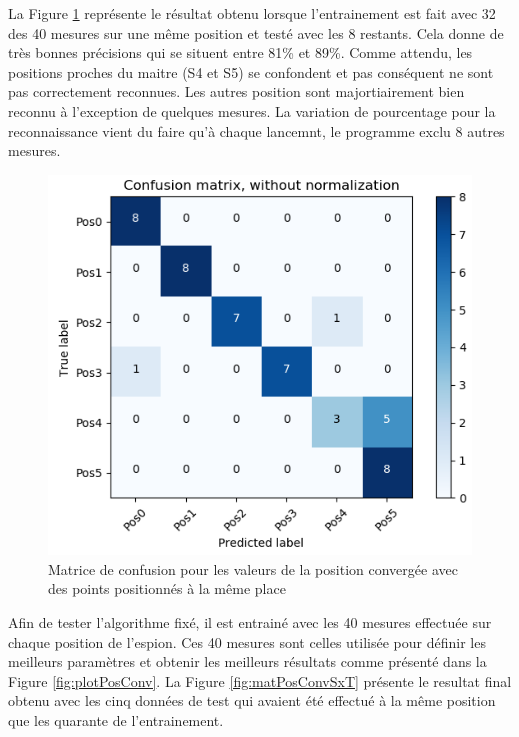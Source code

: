 La Figure \ref{fig:matPosConvSx} représente le résultat obtenu lorsque l'entrainement est fait avec 32 des 40 mesures sur une même position et testé avec les 8 restants. Cela donne de très bonnes précisions qui se situent entre 81\% et 89\%. Comme attendu, les positions proches du maitre (S4 et S5) se confondent et pas conséquent ne sont pas correctement reconnues. Les autres position sont majortiairement bien reconnu à l'exception de quelques mesures. La variation de pourcentage pour la reconnaissance vient du faire qu'à chaque lancemnt, le programme exclu 8 autres mesures.

\begin{figure}[htp]
	\begin{center}
		\includegraphics[scale=0.5]{figures/mat_pos_conv_Sx_2.PNG}
		\caption{Matrice de confusion pour les valeurs de la position convergée avec des points positionnés à la même place}
		\label{fig:matPosConvSx} %
	\end{center}
\end{figure}

Afin de tester l'algorithme fixé, il est entrainé avec les 40 mesures effectuée sur chaque position de l'espion. Ces 40 mesures sont celles utilisée pour définir les meilleurs paramètres et obtenir les meilleurs résultats comme présenté dans la Figure \ref{fig:plotPosConv}. La Figure \ref{fig:matPosConvSxT} présente le resultat final obtenu avec les cinq données de test qui avaient été effectué à la même position que les quarante de l'entrainement. 

